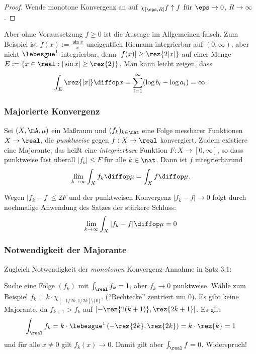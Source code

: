 \begin{proof}
 Wende monotone Konvergenz an auf $\chi_{[\eps,R]} f \uparrow f$ für $\eps \to 0$, $R \to \infty$.
\end{proof}

Aber ohne Voraussetzung $f \ge 0$ ist die Aussage im Allgemeinen falsch. Zum Beispiel ist $f(x) := \frac{\sin x}{x}$ uneigentlich Riemann-integrierbar auf $(0,\infty)$, aber nicht $\lebesgue^1$-integrierbar, denn $|f(x)| \ge \rez{2 |x|}$ auf einer Menge $E := \{ x \in \real: |\sin x| \ge \rez{2} \}$. Man kann leicht zeigen, dass
\[ \int_E \rez{|x|} \diffop x = \sum_{i=1}^\infty ( \log b_i - \log a_i ) = \infty. \]

\subsubsection{Majorierte Konvergenz}
\begin{thm}
 Sei $(X, \mA, \mu)$ ein Maßraum und $(f_k)_{k \in \nat}$ eine Folge messbarer Funktionen $X \to \real$, die \emph{punktweise} gegen $f:X \to \real$ konvergiert. Zudem existiere eine Majorante, das heißt eine \emph{integrierbare} Funktion $F\colon X \to [0, \infty]$, so dass punktweise fast überall $|f_k| \le F$ für alle $k \in \nat$. Dann ist $f$ integrierbar\footnotemark und
 \[ \lim_{k \to \infty} \int_X f_k \diffop \mu = \int_X f \diffop \mu. \]
\end{thm}

\begin{rmrk}
 Wegen $|f_k -f| \le 2F$ und der punktweisen Konvergenz $|f_k - f| \to 0$ folgt durch nochmalige Anwendung des Satzes der stärkere Schluss:
 \[ \lim_{k\to\infty}\int_X |f_k - f| \diffop \mu = 0 \]
\end{rmrk}

\subsubsection*{Notwendigkeit der Majorante}
Zugleich Notwendigkeit der \emph{monotonen} Konvergenz-Annahme in Satz 3.1:

Suche eine Folge $(f_k)$ mit $\int_\real f_k = 1$, aber $f_k \to 0$ punktweise. Wähle zum Beispiel $f_k = k \cdot \chi_{[-1/2k,1/2k]\setminus \{ 0 \}}$. (``Rechtecke'' zentriert um 0). Es gibt keine Majorante, da $f_{k+1} > f_k$ auf $\left[ -\rez{2(k+1)}, \rez{2k+1} \right]$. Es gilt
\[ \int_\real f_k = k \cdot \lebesgue^1 \left( -\rez{2k}, \rez{2k} \right) = k \cdot \rez{k} = 1 \]
und für alle $x \ne 0$ gilt $f_k(x) \to 0$. Damit gilt aber $\int_\real f = 0$. Widerspruch!

